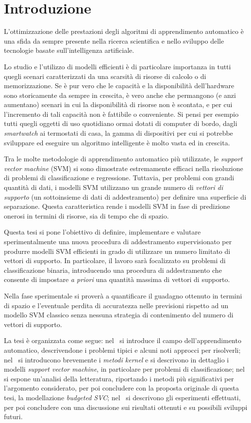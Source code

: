 \chapter{Introduzione}
\label{chap:introduzione}
L'ottimizzazione delle prestazioni degli algoritmi di apprendimento automatico è una sfida da sempre presente nella ricerca scientifica e nello sviluppo delle tecnologie basate sull'intelligenza artificiale.

Lo studio e l'utilizzo di modelli efficienti è di particolare importanza in tutti quegli scenari caratterizzati da una scarsità di risorse di calcolo o di memorizzazione.
Se è pur vero che le capacità e la disponibilità dell'hardware sono storicamente da sempre in crescita, è vero anche che permangono (e anzi aumentano) scenari in cui la disponibilità di risorse non è scontata, e per cui l'incremento di tali capacità non è fattibile o conveniente.
Si pensi per esempio tutti quegli oggetti di uso quotidiano ormai dotati di computer di bordo, dagli \emph{smartwatch} ai termostati di casa, la gamma di dispositivi per cui si potrebbe sviluppare ed eseguire un algoritmo intelligente è molto vasta ed in crescita.

Tra le molte metodologie di apprendimento automatico più utilizzate, le \emph{support vector machine} (SVM) si sono dimostrate estremamente efficaci nella risoluzione di problemi di classificazione e regressione. 
Tuttavia, per problemi con grandi quantità di dati, i modelli SVM utilizzano un grande numero di \emph{vettori di supporto} (un sottoinsieme di dati di addestramento) per definire una superficie di separazione. 
Questa caratteristica rende i modelli SVM in fase di predizione onerosi in termini di risorse, sia di tempo che di spazio.

Questa tesi si pone l'obiettivo di definire, implementare e valutare sperimentalmente una nuova procedura di addestramento supervisionato per produrre modelli SVM efficienti in grado di utilizzare un numero limitato di vettori di supporto.
In particolare, il lavoro sarà focalizzato su problemi di classificazione binaria, introducendo una procedura di addestramento che consente di impostare \emph{a priori} una quantità massima di vettori di supporto.

Nella fase sperimentale si proverà a quantificare il guadagno ottenuto in termini di spazio e l'eventuale perdita di accuratezza nelle previsioni rispetto ad un modello SVM classico senza nessuna strategia di contenimento del numero di vettori di supporto.

La tesi è organizzata come segue: nel~ si introduce il campo dell'apprendimento automatico, descrivendone i problemi tipici e alcuni noti approcci per risolverli; nel~ si introducono brevemente i \emph{metodi kernel} e si descrivono in dettaglio i modelli \emph{support vector machine}, in particolare per problemi di classificazione; nel~ si espone un'analisi della letteratura, riportando i metodi più significativi per l'argomento considerato, per poi concludere con la proposta originale di questa tesi, la modellazione \emph{budgeted SVC}; nel~ si descrivono gli esperimenti effettuati, per poi concludere con una discussione sui risultati ottenuti e su possibili sviluppi futuri.
